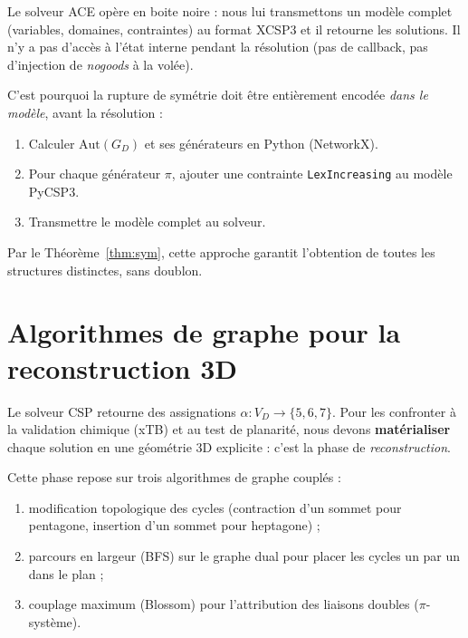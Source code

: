 \documentclass[12pt,a4paper]{article}
\theoremstyle{definition}
\theoremstyle{remark}
\newcommand{\GD}{G_{\!D}}
\newcommand{\VD}{V_{\!D}}
\newcommand{\Aut}{\mathrm{Aut}}
\begin{document}
Le solveur ACE op\`ere en \og boite noire \fg{} : nous lui transmettons
un mod\`ele complet (variables, domaines, contraintes) au format XCSP3
et il retourne les solutions. Il n'y a pas d'acc\`es \`a l'\'etat interne
pendant la r\'esolution (pas de callback, pas d'injection de
\emph{nogoods} \`a la vol\'ee).

C'est pourquoi la rupture de sym\'etrie doit \^etre enti\`erement encod\'ee
\emph{dans le mod\`ele}, avant la r\'esolution :
\begin{enumerate}[leftmargin=*]
  \item Calculer $\Aut(\GD)$ et ses g\'en\'erateurs en Python (NetworkX).
  \item Pour chaque g\'en\'erateur $\pi$, ajouter une contrainte
        \texttt{LexIncreasing} au mod\`ele PyCSP3.
  \item Transmettre le mod\`ele complet au solveur.
\end{enumerate}

Par le Th\'eor\`eme~\ref{thm:sym}, cette approche garantit l'obtention
de toutes les structures distinctes, sans doublon.

\section{Algorithmes de graphe pour la reconstruction 3D}
\label{sec:reconstruction}

Le solveur CSP retourne des assignations $\alpha : \VD \to \{5, 6, 7\}$.
Pour les confronter \`a la validation chimique (xTB) et au test de
planarit\'e, nous devons \textbf{mat\'erialiser} chaque solution en une
g\'eom\'etrie 3D explicite : c'est la phase de \emph{reconstruction}.

Cette phase repose sur trois algorithmes de graphe coupl\'es :
\begin{enumerate}[leftmargin=*]
  \item modification topologique des cycles (contraction d'un sommet
        pour pentagone, insertion d'un sommet pour heptagone) ;
  \item parcours en largeur (BFS) sur le graphe dual pour placer les
        cycles \og un par un \fg{} dans le plan ;
  \item couplage maximum (Blossom) pour l'attribution des liaisons
        doubles ($\pi$-syst\`eme).
\end{enumerate}
\end{document}
